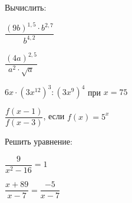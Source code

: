 \begin{listofex}
	\item Вычислить:
	\begin{enumcols}[itemcolumns=2]
		\item \( \dfrac{(9b)^{1,5}\cdot b^{2,7}}{b^{4,2}} \)
		\item \( \dfrac{(4a)^{2,5}}{a^2\cdot\sqrt{a}} \)
		\item \( 6x\cdot(3x^{12})^3:(3x^9)^4 \) при \( x=75 \)
		\item \( \dfrac{f(x-1)}{f(x-3)} \), если \( f(x)=5^x \)
	\end{enumcols}
	\item Решить уравнение:
	\begin{enumcols}[itemcolumns=2]
		\item \( \dfrac{9}{x^2-16}=1 \)
		\item \( \dfrac{x+89}{x-7}=\dfrac{-5}{x-7} \)
		\item {}
	\end{enumcols}
\end{listofex}
